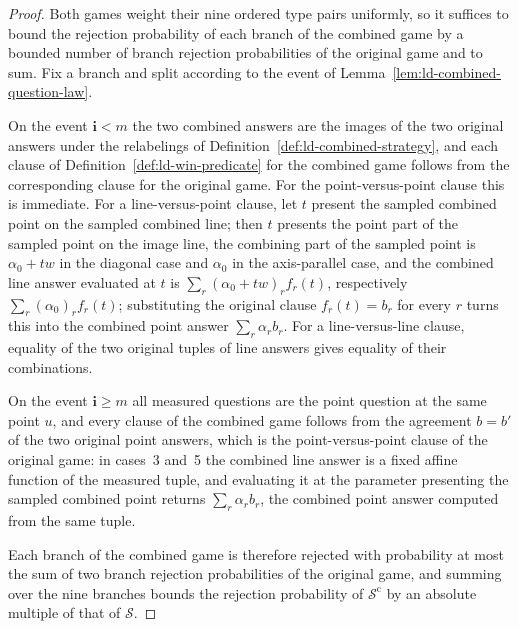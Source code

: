 \begin{proof}
	\leanok
	Both games weight their nine ordered type pairs uniformly, so it suffices to
	bound the rejection probability of each branch of the combined game by a
	bounded number of branch rejection probabilities of the original game and to
	sum.  Fix a branch and split according to the event of
	Lemma~\ref{lem:ld-combined-question-law}.

	On the event $\mathbf{i} < m$ the two combined answers are the images of the
	two original answers under the relabelings of
	Definition~\ref{def:ld-combined-strategy}, and each clause of
	Definition~\ref{def:ld-win-predicate} for the combined game follows from the
	corresponding clause for the original game.  For the point-versus-point
	clause this is immediate.  For a line-versus-point clause, let $t$ present
	the sampled combined point on the sampled combined line; then $t$ presents
	the point part of the sampled point on the image line, the combining part of
	the sampled point is $\alpha_0 + t w$ in the diagonal case and $\alpha_0$ in
	the axis-parallel case, and the combined line answer evaluated at $t$ is
	$\sum_r (\alpha_0 + t w)_r f_r(t)$, respectively $\sum_r (\alpha_0)_r f_r(t)$;
	substituting the original clause $f_r(t) = b_r$ for every $r$ turns this into
	the combined point answer $\sum_r \alpha_r b_r$.  For a line-versus-line
	clause, equality of the two original tuples of line answers gives equality of
	their combinations.

	On the event $\mathbf{i} \ge m$ all measured questions are the point question
	at the same point $u$, and every clause of the combined game follows from the
	agreement $b = b'$ of the two original point answers, which is the
	point-versus-point clause of the original game: in cases~3 and~5 the combined
	line answer is a fixed affine function of the measured tuple, and evaluating
	it at the parameter presenting the sampled combined point returns
	$\sum_r \alpha_r b_r$, the combined point answer computed from the same
	tuple.

	Each branch of the combined game is therefore rejected with probability at
	most the sum of two branch rejection probabilities of the original game, and
	summing over the nine branches bounds the rejection probability of
	$\mathcal S^{\mathrm c}$ by an absolute multiple of that of $\mathcal S$.
\end{proof}

